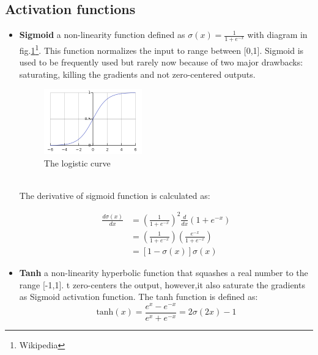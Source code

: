 \subsection{Activation functions}
\begin{itemize}
    \item \textbf{Sigmoid} a non-linearity function defined as $\sigma(x)=\frac{1}{1 + e^{-x}}$ with diagram in fig.\ref{fig:sigmoid}\footnote{Wikipedia}.
     This function normalizes the input to range between [0,1]. Sigmoid is used to be frequently
     used but rarely now because of two major drawbacks: saturating, killing the gradients and not zero-centered outputs.\cite{cs231n}\\
    \begin{figure}[h!]
        \centering
        \includegraphics[width=0.4\textwidth]{Chapters/Fig/sigmoid.png}
        \caption{The logistic curve}
        \label{fig:sigmoid}
    \end{figure}\\
    The derivative of sigmoid function is calculated as:
    \begin{center}
        \begin{equation}
            \begin{split}
                \frac{d\sigma(x)}{dx} & = (\frac{1}{1+e^{-x}})^2\frac{d}{dx}(1+e^{-x})\\
                                    & = (\frac{1}{1+e^{-x}})(\frac{e^{-x}}{1+e^{-x}})\\
                                    & = [1-\sigma(x)]\sigma(x)
            \end{split}
        \end{equation}
    \end{center}
    \pagebreak
    \item \textbf{Tanh} a non-linearity hyperbolic function that squashes a real number to the range [-1,1]. 
    t zero-centers the output, however,it also saturate the gradients as Sigmoid activation function\cite{cs231n}. The tanh function is defined as:
    \begin{equation}
        \text{tanh}(x) = \frac{e^x - e^{-x}}{e^x + e^{-x}} = 2\sigma(2x) - 1

\end{equation}
\end{itemize}
